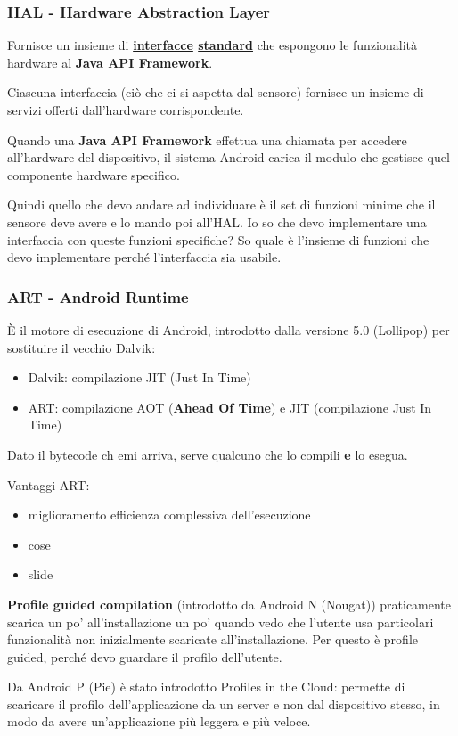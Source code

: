 \subsubsection{HAL - Hardware Abstraction Layer}
\par Fornisce un insieme di \textbf{\underline{interfacce} \underline{standard}} che espongono le funzionalità hardware al \textbf{Java API Framework}.
\par Ciascuna interfaccia (ciò che ci si aspetta dal sensore) fornisce un insieme di servizi offerti dall'hardware corrispondente.
\par Quando una \textbf{Java API Framework} effettua una chiamata per accedere all'hardware del dispositivo, il sistema Android carica il modulo che gestisce quel componente hardware specifico.
\par Quindi quello che devo andare ad individuare è il set di funzioni minime che il sensore deve avere e lo mando poi all'HAL. Io so che devo implementare una interfaccia con queste funzioni specifiche? So quale è l'insieme di funzioni che devo implementare perché l'interfaccia sia usabile.

\subsubsection{ART - Android Runtime}
\par \`E il motore di esecuzione di Android, introdotto dalla versione 5.0 (Lollipop) per sostituire il vecchio Dalvik:
\begin{itemize}
    \item Dalvik: compilazione JIT (Just In Time)
    \item ART: compilazione AOT (\textbf{Ahead Of Time}) e JIT (compilazione Just In Time)
\end{itemize}
\par Dato il bytecode ch emi arriva, serve qualcuno che lo compili \textbf{e} lo esegua. 
\par Vantaggi ART:
\begin{itemize}
    \item miglioramento efficienza complessiva dell'esecuzione
    \item cose
    \item slide
\end{itemize}
\par \textbf{Profile guided compilation} (introdotto da Android N (Nougat)) praticamente scarica un po' all'installazione un po' quando vedo che l'utente usa particolari funzionalità non inizialmente scaricate all'installazione. Per questo è profile guided, perché devo guardare il profilo dell'utente.
\par Da Android P (Pie) è stato introdotto Profiles in the Cloud: permette di scaricare il profilo dell'applicazione da un server e non dal dispositivo stesso, in modo da avere un'applicazione più leggera e più veloce.

